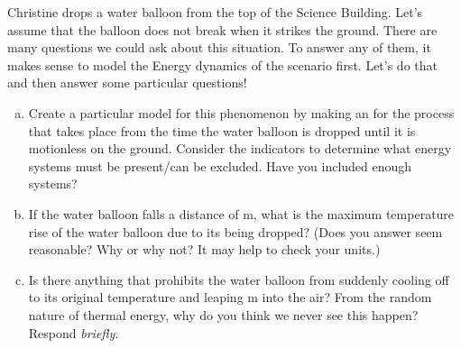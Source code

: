 \label{fnt2.2.1-5}

Christine drops a water balloon from the top of the Science Building. Let's assume that the balloon does not break when it strikes the ground. There are many questions we could ask about this situation. To answer any of them, it makes sense to model the Energy dynamics of the scenario first. Let's do that and then answer some particular questions!

\begin{enumerate}[(a)]
	\item \label{fnt2.2.1-5a} Create a particular model for this phenomenon by making an \EnergyDiagram{} for the process that takes place from the time the water balloon is dropped until it is motionless on the ground. Consider the indicators to determine what energy systems must be present/can be excluded. Have you included enough systems?
	\item If the water balloon falls a distance of \unit[21]{m}, what is the maximum temperature rise of the water balloon due to its being dropped? (Does you answer seem reasonable? Why or why not? It may help to check your units.)
	\item Is there anything that prohibits the water balloon from suddenly cooling off to its original temperature and leaping \unit[21]{m} into the air? From the random nature of thermal energy, why do you think we never see this happen? Respond {\em briefly}.
\end{enumerate}